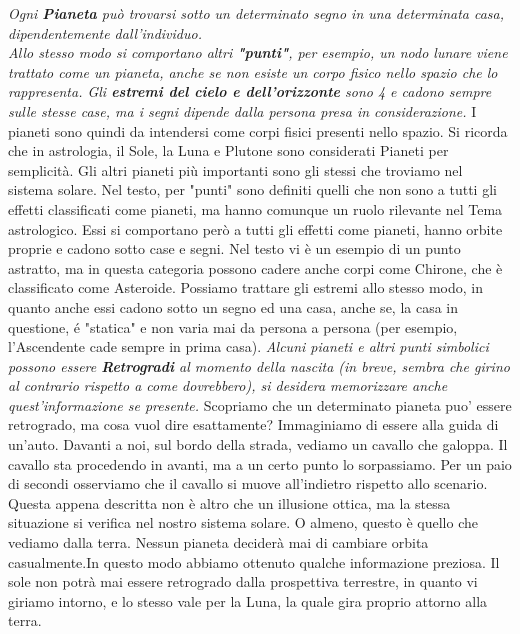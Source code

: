 \mline
\textit{
  Ogni \textbf{Pianeta} può trovarsi sotto un determinato segno in una determinata casa, dipendentemente dall'individuo.\\
  Allo stesso modo si comportano altri \textbf{"punti"}, per esempio, un nodo lunare viene trattato come un pianeta, anche se non esiste un corpo fisico nello spazio che lo rappresenta. Gli \textbf{estremi del cielo e dell'orizzonte} sono 4 e cadono sempre sulle stesse case, ma i segni dipende dalla persona presa in considerazione.
}
\mline
I pianeti sono quindi da intendersi come corpi fisici presenti nello spazio. Si ricorda che in astrologia, il Sole, la Luna e Plutone sono considerati Pianeti per semplicità. Gli altri pianeti più importanti sono gli stessi che troviamo nel sistema solare.\newline
Nel testo, per "punti" sono definiti quelli che non sono a tutti gli effetti classificati come pianeti, ma hanno comunque un ruolo rilevante nel Tema astrologico. Essi si comportano però a tutti gli effetti come pianeti, hanno orbite proprie e cadono sotto case e segni. Nel testo vi è un esempio di un punto astratto, ma in questa categoria possono cadere anche corpi come Chirone, che è classificato come Asteroide.\newline
Possiamo trattare gli estremi allo stesso modo, in quanto anche essi cadono sotto un segno ed una casa, anche se, la casa in questione, é "statica" e non varia mai da persona a persona (per esempio, l'Ascendente cade sempre in prima casa).
\mline
\textit{
  Alcuni pianeti e altri punti simbolici possono essere \textbf{Retrogradi} al momento della nascita (in breve, sembra che girino al contrario rispetto a come dovrebbero), si desidera memorizzare anche quest'informazione se presente.
}
\mline
Scopriamo che un determinato pianeta puo' essere retrogrado, ma cosa vuol dire esattamente?\newline
Immaginiamo di essere alla guida di un'auto. Davanti a noi, sul bordo della strada, vediamo un cavallo che galoppa.
Il cavallo sta procedendo in avanti, ma a un certo punto lo sorpassiamo. Per un paio di secondi osserviamo che il cavallo si muove all'indietro rispetto allo scenario. Questa appena descritta non è altro che un illusione ottica, ma la stessa situazione si verifica nel nostro sistema solare. O almeno, questo è quello che vediamo dalla terra. Nessun pianeta deciderà mai di cambiare orbita casualmente.\newline In questo modo abbiamo ottenuto qualche informazione preziosa. Il sole non potrà mai essere retrogrado dalla prospettiva terrestre, in quanto vi giriamo intorno, e lo stesso vale per la Luna, la quale gira proprio attorno alla terra.\newline
